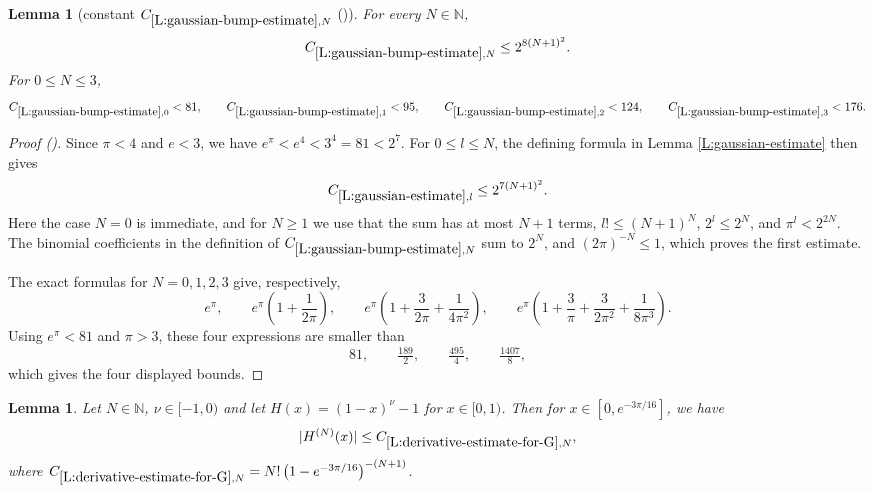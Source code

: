 \documentclass[12pt,reqno]{amsart}
\newcommand{\auto}{{({\tiny\faCar})}}
\theoremstyle{plain}
\newtheorem{lemma}[theorem]{Lemma}
\numberwithin{equation}{section}
\theoremstyle{remark}
\newcommand{\uses}[1]{}
\newcommand{\usesdefs}[1]{}
\newcommand{\N}{{\mathbb N}}
\begin{document}
\begin{lemma}[constant $C_{\ref{L:gaussian-bump-estimate},N}$ \auto]\label{constant gaussian bump estimate}\uses{L:gaussian-estimate,L:gaussian-bump-estimate}\usesdefs{}
For every $N\in\N$,
\begin{equation}\label{constant gaussian bump estimate bound}
C_{\ref{L:gaussian-bump-estimate},N}\le2^{8(N+1)^2}.
\end{equation}
For $0\le N\le3$,
\begin{equation}\label{auto:constant-gaussian-bump-estimate-small}
C_{\ref{L:gaussian-bump-estimate},0}<81,\qquad
C_{\ref{L:gaussian-bump-estimate},1}<95,\qquad
C_{\ref{L:gaussian-bump-estimate},2}<124,\qquad
C_{\ref{L:gaussian-bump-estimate},3}<176.
\end{equation}
\end{lemma}
\begin{proof}[Proof \auto]
Since $\pi<4$ and $e<3$, we have $e^\pi<e^4<3^4=81<2^7$. For $0\le l\le N$, the defining formula in Lemma \ref{L:gaussian-estimate} then gives
\[
C_{\ref{L:gaussian-estimate},l}\le2^{7(N+1)^2}.
\]
Here the case $N=0$ is immediate, and for $N\ge1$ we use that the sum has at most $N+1$ terms, $l!\le(N+1)^N$, $2^l\le2^N$, and $\pi^l<2^{2N}$. The binomial coefficients in the definition of $C_{\ref{L:gaussian-bump-estimate},N}$ sum to $2^N$, and $(2\pi)^{-N}\le1$, which proves the first estimate.

The exact formulas for $N=0,1,2,3$ give, respectively,
\[
e^\pi,
\qquad
e^\pi\left(1+\frac1{2\pi}\right),
\qquad
e^\pi\left(1+\frac3{2\pi}+\frac1{4\pi^2}\right),
\qquad
e^\pi\left(1+\frac3\pi+\frac3{2\pi^2}+\frac1{8\pi^3}\right).
\]
Using $e^\pi<81$ and $\pi>3$, these four expressions are smaller than
\[
81,\qquad \tfrac{189}{2},\qquad \tfrac{495}{4},\qquad \tfrac{1407}{8},
\]
which gives the four displayed bounds.
\end{proof}


\begin{lemma}\label{L:derivative-estimate-for-G}\uses{}\usesdefs{}
Let $N\in \N$, $\nu\in [-1,0)$ and let $H(x)=(1-x)^{\nu}-1$ for $x\in [0,1)$. Then for $x\in [0,e^{-3\pi/16}]$, we have
\begin{equation}\label{auto:exponential-composition-derivative-bound}
|H^{(N)}(x)| \leq C_{\ref{L:derivative-estimate-for-G},N},
\end{equation}
where $C_{\ref{L:derivative-estimate-for-G},N}= N! \left(1 - e^{-3\pi/16}\right)^{-(N+1)}$.
\end{lemma}
\end{document}
